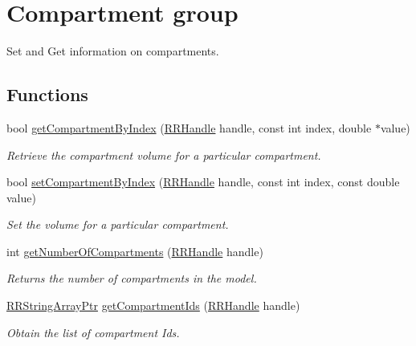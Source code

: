 \hypertarget{group__compartment}{\section{Compartment group}
\label{group__compartment}
}


Set and Get information on compartments.  


\subsection*{Functions}
\begin{DoxyCompactItemize}
\item 
bool \hyperlink{group__compartment_ga9de42b53c1d31e477f7172d170a53d65}{get\+Compartment\+By\+Index} (\hyperlink{rrc__types_8h_a1d68f0592372208fa5a5f2799ea4b3ae}{R\+R\+Handle} handle, const int index, double $\ast$value)
\begin{DoxyCompactList}\small\item\em Retrieve the compartment volume for a particular compartment. \end{DoxyCompactList}\item 
bool \hyperlink{group__compartment_gaebcce9341fbd6568d8076e595d54818c}{set\+Compartment\+By\+Index} (\hyperlink{rrc__types_8h_a1d68f0592372208fa5a5f2799ea4b3ae}{R\+R\+Handle} handle, const int index, const double value)
\begin{DoxyCompactList}\small\item\em Set the volume for a particular compartment. \end{DoxyCompactList}\item 
int \hyperlink{group__compartment_gabc437da46732973852cbbc11a03843d7}{get\+Number\+Of\+Compartments} (\hyperlink{rrc__types_8h_a1d68f0592372208fa5a5f2799ea4b3ae}{R\+R\+Handle} handle)
\begin{DoxyCompactList}\small\item\em Returns the number of compartments in the model. \end{DoxyCompactList}\item 
\hyperlink{rrc__types_8h_a7c9475df6c7337d99482b13a365e7596}{R\+R\+String\+Array\+Ptr} \hyperlink{group__compartment_ga49d71e059c4ccdf92d0a48d180174ec1}{get\+Compartment\+Ids} (\hyperlink{rrc__types_8h_a1d68f0592372208fa5a5f2799ea4b3ae}{R\+R\+Handle} handle)
\begin{DoxyCompactList}\small\item\em Obtain the list of compartment Ids. \end{DoxyCompactList}\end{DoxyCompactItemize}


